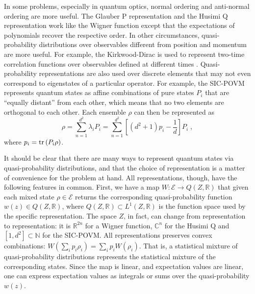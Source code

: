\documentclass[10pt,twocolumn, nofootinbib]{revtex4-2}
\newcommand{\Ens}[1][E] {\mathcal{#1}} %
\begin{document}
In some problems, especially in quantum optics, normal ordering and anti-normal ordering are more useful. The Glauber P representation and the Husimi Q representation work like the Wigner function except that the expectations of polynomials recover the respective order. In other circumstances, quasi-probability distributions over observables different from position and momentum are more useful. For example, the Kirkwood-Dirac is used to represent two-time correlation functions over observables defined at different times \cite{lostaglio2023}. Quasi-probability representations are also used over discrete elements that may not even correspond to eigenstates of a particular operator. For example, the SIC-POVM represents quantum states as affine combinations of pure states $P_i$ that are ``equally distant'' from each other, which means that no two elements are orthogonal to each other. Each ensemble $\rho$ can then be represented as \cite[eqs. 28-29]{fuchs2004}
\begin{equation}
	\rho = \sum_{n=1}^{d^2} \lambda_i P_i = \sum_{n=1}^{d^2} \left[ (d^2 + 1) p_i - \frac{1}{d} \right] P_i \; ,
\end{equation}
where $p_i = \operatorname{tr} \left(P_i \rho\right)$.

It should be clear that there are many ways to represent quantum states via quasi-probability distributions, and that the choice of representation is a matter of convenience for the problem at hand. All representations, though, have the following features in common. First, we have a map $W : \Ens \to Q(Z,\mathbb{R})$ that given each mixed state $\rho \in \Ens$ returns the corresponding quasi-probability function $w(z) \in Q(Z,\mathbb{R})$, where $Q(Z,\mathbb{R}) \subset L^1(Z,\mathbb{R})$ is the function space used by the specific representation. The space $Z$, in fact, can change from representation to representation: it is $\mathbb{R}^{2n}$ for a Wigner function, $\mathbb{C}^n$ for the Husimi Q and $[1, d^2] \subset \mathbb{N}$ for the SIC-POVM. All representations preserves convex combinations: $W(\sum_i p_i \rho_i) = \sum_i p_i W(\rho_i)$. That is, a statistical mixture of quasi-probability distributions represents the statistical mixture of the corresponding states. Since the map is linear, and expectation values are linear, one can express expectation values as integrals or sums over the quasi-probability $w(z)$. 

\end{document}
